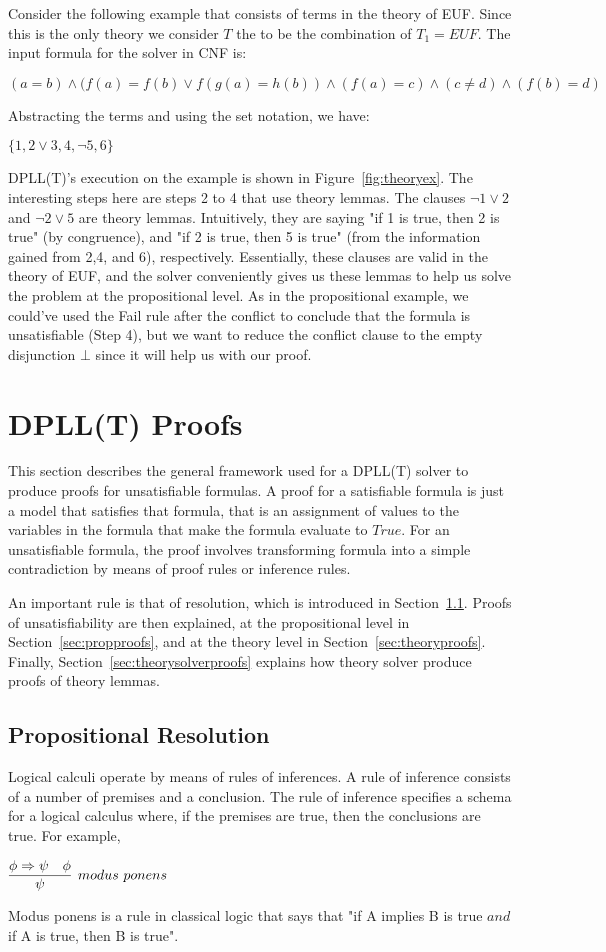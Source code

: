 \documentclass{article}
\begin{document}
Consider the following example that consists of terms 
in the theory of EUF. Since this is the only theory we consider 
$T$ the to be the combination of $T_1 = EUF$.
The input formula for the solver 
in CNF is: 
\begin{center}
$(a = b) \land (f(a) = f(b) \lor f(g(a) = h(b)) \land
(f(a) = c) \land (c \neq d) \land (f(b) = d)$ 
\end{center}
Abstracting the terms and using the set notation, we have:
\begin{center}
$\{1, 2 \lor 3, 4, \neg 5, 6\}$
\end{center}
DPLL(T)'s execution on the example is shown in 
Figure~\ref{fig:theoryex}. The interesting steps here 
are steps 2 to 4 that use theory lemmas. The clauses 
$\neg 1 \lor 2$ and $\neg 2 \lor 5$ are theory lemmas.
Intuitively, they are saying "if 1 is true, then 2 is 
true" (by congruence), and "if 2 is true, then 5 is true"
(from the information gained from 2,4, and 6), respectively. 
Essentially, these clauses are valid in the theory of 
EUF, and the solver conveniently gives us these lemmas 
to help us solve the problem at the propositional level.
As in the propositional example, we could've used 
the Fail rule after the conflict to conclude that 
the formula is unsatisfiable (Step 4), but we want 
to reduce the conflict clause to the empty disjunction
$\bot$ since it will help us with our proof.


\section{DPLL(T) Proofs}
\label{sec:proofs}
This section describes the general framework used for a 
DPLL(T) solver to produce proofs for unsatisfiable formulas. 
A proof for a satisfiable formula is just a model that 
satisfies that formula, that is an assignment of values to 
the variables in the formula that make the formula evaluate 
to $True$. For an unsatisfiable formula, the proof involves 
transforming formula into a simple contradiction by means 
of proof rules or inference rules. 

An important rule is that of resolution, which is introduced 
in Section~\ref{sec:res}. Proofs of unsatisfiability are then 
explained, at the propositional level in 
Section~\ref{sec:propproofs}, and at the theory level in 
Section~\ref{sec:theoryproofs}. Finally, 
Section~\ref{sec:theorysolverproofs} explains how
theory solver produce proofs of theory lemmas.

\subsection{Propositional Resolution}
\label{sec:res}
Logical calculi operate by means of rules of inferences. A
rule of inference consists of a number of premises and a 
conclusion. The rule of inference specifies a schema for a 
logical calculus where, if the premises are true, then 
the conclusions are true. For example,
\begin{center}
	$\infer[modus\ ponens]{\psi}{\phi \Rightarrow \psi & \phi}$
\end{center}
Modus ponens is a rule in classical logic that says that 
"if A implies B is true $and$ if A is true, then B is true".
\end{document}
